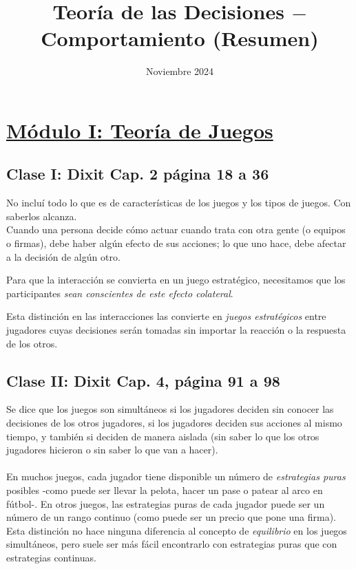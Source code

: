 \documentclass{article}
\title{Teoría de las Decisiones $-$ Comportamiento (Resumen)}
\date{Noviembre 2024}
\begin{document}
    \maketitle
    \thispagestyle{main} %
    
\section*{\underline{Módulo I: Teoría de Juegos}}
    \subsection*{\textbf{Clase I: Dixit Cap. 2 página 18 a 36}}
        No incluí todo lo que es de características de los juegos y los tipos de juegos. Con saberlos alcanza.
        \\
        Cuando una persona decide cómo actuar cuando trata con otra gente (o equipos o firmas), debe haber algún efecto de sus acciones; lo que uno hace, debe afectar a la decisión de algún otro.

        Para que la interacción se convierta en un juego estratégico, necesitamos que los participantes \emph{sean conscientes de este efecto colateral}.

        Esta distinción en las interacciones las convierte en \emph{juegos estratégicos} entre jugadores cuyas decisiones serán tomadas sin importar la reacción o la respuesta de los otros.

    
    \subsection*{\textbf{Clase II: Dixit Cap. 4, página 91 a 98}}
        Se dice que los juegos son simultáneos si los jugadores deciden sin conocer las decisiones de los otros jugadores, si los jugadores deciden sus acciones al mismo tiempo, y también si deciden de manera aislada (sin saber lo que los otros jugadores hicieron o sin saber lo que van a hacer).
        \\
        \\
        En muchos juegos, cada jugador tiene disponible un número de \emph{estrategias puras} posibles -como puede ser llevar la pelota, hacer un pase o patear al arco en fútbol-. En otros juegos, las estrategias puras de cada jugador puede ser un número de un rango continuo (como puede ser un precio que pone una firma). Esta distinción no hace ninguna diferencia al concepto de \emph{equilibrio} en los juegos simultáneos, pero suele ser más fácil encontrarlo con estrategias puras que con estrategias continuas.
\end{document}
